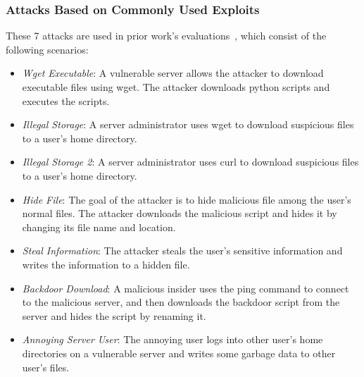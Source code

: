 \subsubsection{Attacks Based on Commonly Used Exploits}
\label{subsub:benign-cases}
These 7 attacks are used in prior work's evaluations~\cite{exploitdb,liu2018priotracker,kwon2018mci,reduction},
which consist of the following scenarios: 
\begin{itemize}[noitemsep, topsep=1pt, partopsep=1pt, listparindent=\parindent, leftmargin=*]
    \item \textit{Wget Executable}: A vulnerable server allows the attacker to download executable files using wget. 
    The attacker downloads python scripts and executes the scripts.
    \item \textit{Illegal Storage}: A server administrator uses wget to download suspicious files to a user's home directory.
    \item \textit{Illegal Storage 2}: A server administrator uses curl to download suspicious files to a user's home directory.
    \item \textit{Hide File}: The goal of the attacker is to hide malicious file among the user's normal files. 
    The attacker downloads the malicious script and hides it by changing its file name and location.
    \item \textit{Steal Information}: The attacker steals the user's sensitive information and writes the information to a hidden file.
    \item \textit{Backdoor Download}: A malicious insider uses the ping command to connect to the malicious server, and then downloads the backdoor script from the server and hides the script by renaming it.
    \item \textit{Annoying Server User}: 
    The annoying user logs into other user's home directories on a vulnerable server and writes some garbage data to other user's files. 
\end{itemize}







